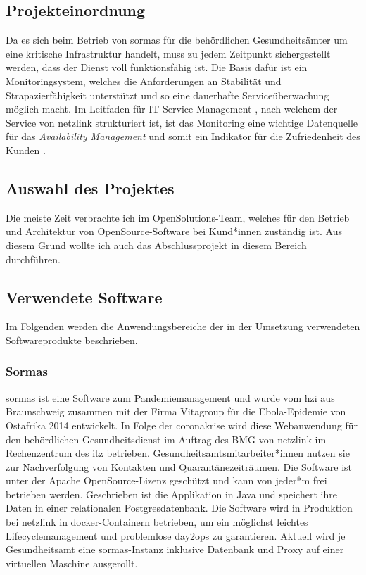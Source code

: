 \documentclass[11pt,a4paper]{article}
\begin{document}
\subsection{Projekteinordnung}
Da es sich beim Betrieb von \gls{sormas} für die behördlichen Gesundheitsämter um eine kritische Infrastruktur handelt,
muss zu jedem Zeitpunkt sichergestellt werden, dass der Dienst voll funktionsfähig ist. Die Basis dafür
ist ein Monitoringsystem, welches die Anforderungen an Stabilität und Strapazierfähigkeit unterstützt
und so eine dauerhafte Serviceüberwachung möglich macht. Im Leitfaden für IT-Service-Management ,
nach welchem der Service von \gls{netzlink} strukturiert ist, ist das Monitoring eine wichtige Datenquelle für das
\emph{\gls{Availability Management}} und somit ein Indikator für die Zufriedenheit des Kunden \cite{itil}.
\subsection{Auswahl des Projektes}
Die meiste Zeit verbrachte ich im OpenSolutions-Team, welches für den Betrieb und Architektur von OpenSource-Software bei Kund*innen
zuständig ist. Aus diesem Grund wollte ich auch das Abschlussprojekt in diesem Bereich durchführen.
\subsection{Verwendete Software}
Im Folgenden werden die Anwendungsbereiche der in der Umsetzung verwendeten Softwareprodukte beschrieben.
\subsubsection{Sormas}
\label{sssec:sormas}
\gls{sormas} ist eine Software zum Pandemiemanagement  und wurde vom \gls{hzi} aus Braunschweig
zusammen mit der Firma Vitagroup für die Ebola-Epidemie von Ostafrika 2014
entwickelt. In Folge der \gls{coronakrise} wird diese Webanwendung für den behördlichen Gesundheitsdienst
im Auftrag des \gls{BMG} von \gls{netzlink} im Rechenzentrum des \gls{itz} betrieben.
Gesundheitsamtsmitarbeiter*innen nutzen sie zur Nachverfolgung
von Kontakten und Quarantänezeiträumen. Die Software ist unter
der Apache OpenSource-Lizenz geschützt und kann von jeder*m frei betrieben werden. Geschrieben ist die Applikation
in Java und speichert ihre Daten in einer relationalen Postgresdatenbank. Die Software wird in Produktion bei \gls{netzlink}
in \gls{docker}-Containern betrieben, um ein möglichst leichtes Lifecyclemanagement und problemlose \gls{day2ops} zu garantieren.
Aktuell wird je Gesundheitsamt eine \gls{sormas}-Instanz inklusive Datenbank und Proxy auf einer virtuellen Maschine ausgerollt. \cite{sormas-oegd}
\end{document}
